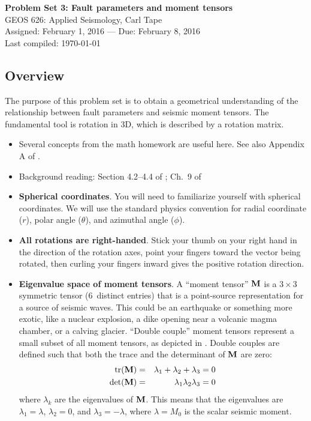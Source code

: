 \documentclass[11pt,titlepage,fleqn]{article}
\begin{document}

\begin{spacing}{1.2}
\centering
{\large \bf Problem Set 3: Fault parameters and moment tensors} \\
GEOS 626: Applied Seismology, Carl Tape \\
Assigned: February 1, 2016 --- Due: February 8, 2016 \\
Last compiled: \today
\end{spacing}

\begin{spacing}{1.0}

\subsection*{Overview}

The purpose of this problem set is to obtain a geometrical understanding of the relationship between fault parameters and seismic moment tensors. The fundamental tool is rotation in 3D, which is described by a rotation matrix.

\begin{itemize}
\item Several concepts from the math homework are useful here. See also Appendix A of \citet{SteinWysession}.

\item Background reading: Section 4.2--4.4 of \citet{SteinWysession}; Ch.~9 of \citet{ShearerE2}

\item {\bf Spherical coordinates}. You will need to familiarize yourself with spherical coordinates. We will use the standard physics convention for radial coordinate ($r$), polar angle ($\theta$), and azimuthal angle ($\phi$).

\item {\bf All rotations are right-handed}. Stick your thumb on your right hand in the direction of the rotation axes, point your fingers toward the vector being rotated, then curling your fingers inward gives the positive rotation direction.

\item {\bf Eigenvalue space of moment tensors}. A ``moment tensor'' $\mbox{${\bf M}$}$ is a $3 \times 3$ symmetric tensor (6~distinct entries) that is a point-source representation for a source of seismic waves. This could be an earthquake or something more exotic, like a nuclear explosion, a dike opening near a volcanic magma chamber, or a calving glacier. ``Double couple'' moment tensors represent a small subset of all moment tensors, as depicted in . Double couples are defined such that both the trace and the determinant of $\mbox{${\bf M}$}$ are zero:
%
\begin{eqnarray*}
{\rm tr}(\mbox{${\bf M}$}) &=& \lambda_1 + \lambda_2 + \lambda_3 = 0
\\
\det(\mbox{${\bf M}$}) &=& \lambda_1 \lambda_2 \lambda_3 = 0
\end{eqnarray*}
%
where $\lambda_k$ are the eigenvalues of $\mbox{${\bf M}$}$. This means that the eigenvalues are $\lambda_1 = \lambda$, $\lambda_2 = 0$, and $\lambda_3 = -\lambda$, where $\lambda = M_0$ is the scalar seismic moment. 


\end{itemize}
\end{spacing}
\end{document}
